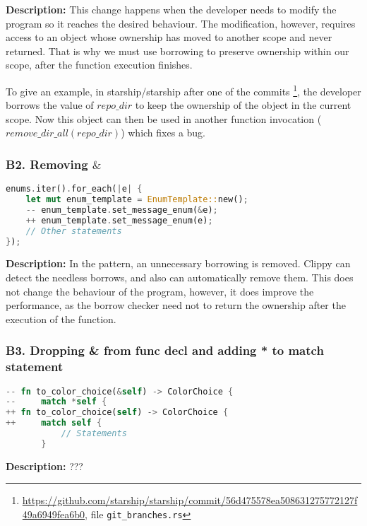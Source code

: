 \noindent \textbf{Description:} This change happens when the developer needs to modify the program so it reaches the desired behaviour. The modification, however, requires access to an object whose ownership has moved to another scope and never returned. That is why we must use borrowing to preserve ownership within our scope, after the function execution finishes.

To give an example, in starship/starship after one of the commits \footnote{\url{https://github.com/starship/starship/commit/56d475578ea508631275772127f49a6949fea6b0}, file \texttt{git\_branches.rs}}, the developer borrows the value of $repo\_dir$ to keep the ownership of the object in the current scope. Now this object can then be used in another function invocation ($remove\_dir\_all(repo\_dir)$) which fixes a bug.

\subsubsection{B2. Removing $\&$}


\begin{lstlisting}[language=Rust, style=colouredRust, label={l3}]
enums.iter().for_each(|e| {
    let mut enum_template = EnumTemplate::new();
    -- enum_template.set_message_enum(&e);
    ++ enum_template.set_message_enum(e);
    // Other statements
});
\end{lstlisting}

\noindent \textbf{Description:} In the pattern, an unnecessary borrowing is removed. Clippy can detect the needless borrows, and also can automatically remove them. This does not change the behaviour of the program, however, it does improve the performance, as the borrow checker need not to return the ownership after the execution of the function.

\subsubsection{B3. Dropping \& from func decl and adding * to match statement}

\begin{lstlisting}[language=Rust, style=colouredRust, label={l3}]
-- fn to_color_choice(&self) -> ColorChoice {
--     match *self {
++ fn to_color_choice(self) -> ColorChoice {
++     match self {
           // Statements
       }
\end{lstlisting}

\noindent \textbf{Description:} ???


